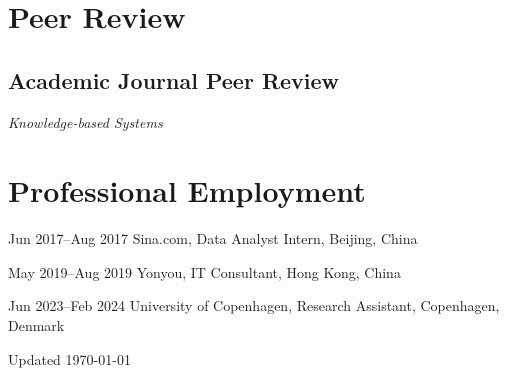 \documentclass[11pt,letterpaper]{report}
\newcommand{\listitemspace}{0.25em}
\renewenvironment{itemize}
{\begin{list}{}{\setlength{\leftmargin}{0em}
                \setlength{\parskip}{0em}
                \setlength{\itemsep}{\listitemspace}
                \setlength{\parsep}{\listitemspace}}}
{\end{list}}
\begin{document}
    \section*{Peer Review}

    \subsection*{Academic Journal Peer Review}

    \begin{itemize}

        \item \textit{Knowledge-based Systems}

    \end{itemize}


    \section*{Professional Employment}

    \begin{tablist}

        \item[Jun 2017--Aug 2017] \tab{}Sina.com, Data Analyst Intern, Beijing, China
        \item[May 2019--Aug 2019] \tab{}Yonyou, IT Consultant, Hong Kong, China
        \item[Jun 2023--Feb 2024] \tab{}University of Copenhagen, Research Assistant, Copenhagen, Denmark
    \end{tablist}



    \begin{center}
        \vfill
        Updated \monthyeardate\today
    \end{center}
\end{document}
